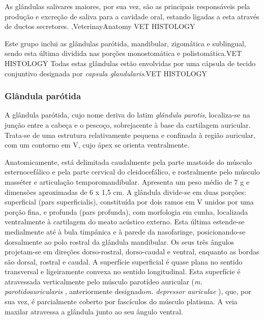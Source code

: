 As glândulas salivares maiores, por sua vez, são as principais responsáveis pela produção e excreção de saliva para a cavidade oral, estando ligadas a esta através de ductos secretores. \cite{Singh2017},VeterinayAnatomy VET HISTOLOGY 

Este grupo inclui as glândulas parótida, mandibular, zigomática e sublingual, sendo esta última dividida nas porções monostomática e polistomática.VET HISTOLOGY Todas estas glândulas estão envolvidas por uma cápsula de tecido conjuntivo designada por \textit{capsula glandularis}.VET HISTOLOGY

\subsubsection{Glândula parótida}

A glândula parótida, cujo nome deriva do latim \textit{glândula parotis}, localiza-se na junção entre a cabeça e o pescoço, sobrejacente  à base da cartilagem auricular. Trata-se de uma estrutura relativamente pequena e confinada à região auricular, com um contorno em V, cujo ápex se orienta ventralmente.\cite{Singh2017}

Anatomicamente, está delimitada caudalmente pela parte mastoide do músculo esternocefálico e pela parte cervical do cleidocefálico, e rostralmente pelo músculo masséter e articulação temporomandibular.\cite{Singh2017} Apresenta um peso médio de 7 g e dimensões aproximadas de 6 x 1,5 cm.\cite{Singh2017}
A glândula divide-se em duas porções: superficial (pars superficialis), constituída por dois ramos em V unidos por uma porção fina, e profunda (pars profunda), com morfologia em cunha, localizada ventralmente à cartilagem do meato acústico externo.\cite{Singh2017} Esta última estende-se medialmente até à bula timpânica e à parede da nasofaringe, posicionando-se dorsalmente ao polo rostral da glândula mandibular.\cite{Singh2017}
Os seus três ângulos projetam-se em direções dorso-rostral, dorso-caudal e ventral, enquanto as bordas são dorsal, rostral e caudal.\cite{Singh2017} A superfície superficial  é quase plana no sentido transversal e ligeiramente convexa no sentido longitudinal.\cite{Singh2017} Esta superfície é atravessada verticalmente pelo músculo parotídeo auricular (\textit{m. parotidoauricularis} , anteriormente designado\textit{m. depressor auriculae} ), que, por sua vez, é parcialmente coberto por fascículos do músculo platisma.\cite{Singh2017} A veia maxilar atravessa a glândula junto ao seu ângulo ventral.\cite{Singh2017}


